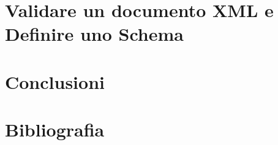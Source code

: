 \documentclass{beamer}
\begin{document}
\section{Validare un documento XML e Definire uno Schema}


%

%

%

\section{Conclusioni}


\section*{Bibliografia}
%
\end{document}
